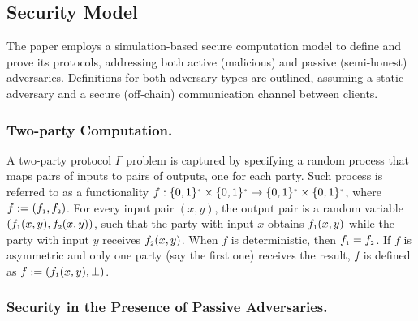 

 
  
\vspace{-2mm}
\subsection{Security Model}\label{sec::sec-model}
\vspace{-1mm}


The paper employs a simulation-based secure computation model \cite{DBLP:books/cu/Goldreich2004} to define and prove its protocols, addressing both active (malicious) and passive (semi-honest) adversaries. Definitions for both adversary types are outlined, assuming a static adversary and a secure (off-chain) communication channel between clients.


%
 
  \vspace{-3mm}
  
 \subsubsection{Two-party Computation.} A two-party protocol $\Gamma$ problem is captured by specifying a random process that maps pairs of inputs to pairs of outputs, one for each party. Such process is referred to as a functionality  $f:\{0,1\}^{\scriptscriptstyle *}\times\{0,1\}^{\scriptscriptstyle *}\rightarrow\{0,1\}^{\scriptscriptstyle *}\times\{0,1\}^{\scriptscriptstyle *}$, where $f:=(f_{\scriptscriptstyle 1},f_{\scriptscriptstyle 2})$. For every input pair $(x,y)$, the output pair is a random variable $(f_{\scriptscriptstyle 1} (x,y), f_{\scriptscriptstyle 2} (x,y))$, such that the party with input $x$ obtains $f_{\scriptscriptstyle 1} (x,y)$ while the party with input $y$ receives $f_{\scriptscriptstyle 2} (x,y)$. When $f$ is deterministic, then $f_{\scriptscriptstyle 1} =f_{\scriptscriptstyle 2}$. If $f$ is asymmetric and only one party (say the first one) receives the result, $f$ is defined as $f:=(f_{\scriptscriptstyle 1}(x,y), \bot)$. 
 
  
  \vspace{-3mm}
 \subsubsection{Security in the Presence of Passive Adversaries.} 
 
